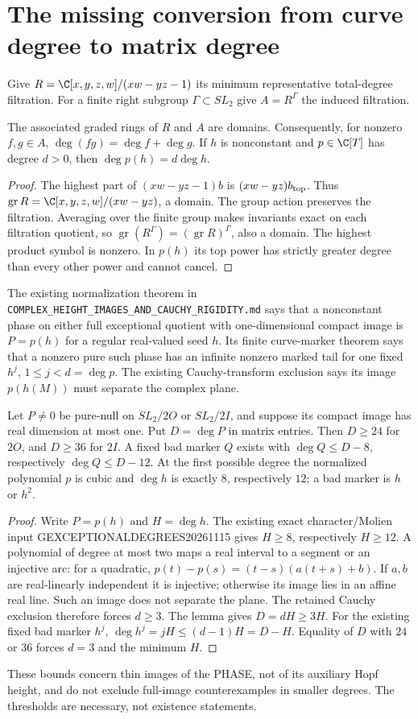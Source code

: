 \section{The missing conversion from curve degree to matrix degree}
Give $R=\C[x,y,z,w]/(xw-yz-1)$ its minimum representative total-degree
filtration. For a finite right subgroup $\Gamma\subset SL_2$ give
$A=R^\Gamma$ the induced filtration.
\begin{lemma}
The associated graded rings of $R$ and $A$ are domains. Consequently, for
nonzero $f,g\in A$, $\deg(fg)=\deg f+\deg g$. If $h$ is nonconstant and
$p\in\C[T]$ has degree $d>0$, then $\deg p(h)=d\deg h$.
\end{lemma}
\begin{proof}
The highest part of $(xw-yz-1)b$ is $(xw-yz)b_{\rm top}$. Thus
$\operatorname{gr}R=\C[x,y,z,w]/(xw-yz)$, a domain. The group action preserves
the filtration. Averaging over the finite group makes invariants exact
on each filtration quotient, so
$\operatorname{gr}(R^\Gamma)=(\operatorname{gr}R)^\Gamma$, also a domain.
The highest product symbol is nonzero. In $p(h)$ its top power has
strictly greater degree than every other power and cannot cancel.
\end{proof}

The existing normalization theorem in
\texttt{COMPLEX\_HEIGHT\_IMAGES\_AND\_CAUCHY\_RIGIDITY.md} says that a
nonconstant phase on either full exceptional quotient with one-dimensional
compact image is $P=p(h)$ for a regular real-valued seed $h$. Its finite
curve-marker theorem says that a nonzero pure such phase has an infinite
nonzero marked tail for one fixed $h^j$, $1\le j<d=\deg p$.
The existing Cauchy-transform exclusion says its image $p(h(M))$ must
separate the complex plane.

\begin{proposition}
Let $P\ne0$ be pure-null on $SL_2/2O$ or $SL_2/2I$, and suppose its compact
image has real dimension at most one. Put $D=\deg P$ in matrix entries.
Then $D\ge24$ for $2O$, and $D\ge36$ for $2I$. A fixed bad marker $Q$ exists
with $\deg Q\le D-8$, respectively $\deg Q\le D-12$.
At the first possible degree the normalized polynomial $p$ is cubic and
$\deg h$ is exactly $8$, respectively $12$; a bad marker is $h$ or $h^2$.
\end{proposition}
\begin{proof}
Write $P=p(h)$ and $H=\deg h$. The existing exact character/Molien input
GEXCEPTIONALDEGREES20261115 gives $H\ge8$, respectively $H\ge12$.
A polynomial of degree at most two maps a real interval to a segment or
an injective arc: for a quadratic,
$p(t)-p(s)=(t-s)(a(t+s)+b)$. If $a,b$ are real-linearly independent it is
injective; otherwise its image lies in an affine real line. Such an image
does not separate the plane. The retained Cauchy exclusion therefore
forces $d\ge3$. The lemma gives $D=dH\ge3H$. For the existing fixed bad
marker $h^j$, $\deg h^j=jH\le(d-1)H=D-H$. Equality of $D$ with $24$ or $36$
forces $d=3$ and the minimum $H$.
\end{proof}
These bounds concern thin images of the PHASE, not of its auxiliary Hopf
height, and do not exclude full-image counterexamples in smaller degrees.
The thresholds are necessary, not existence statements.

